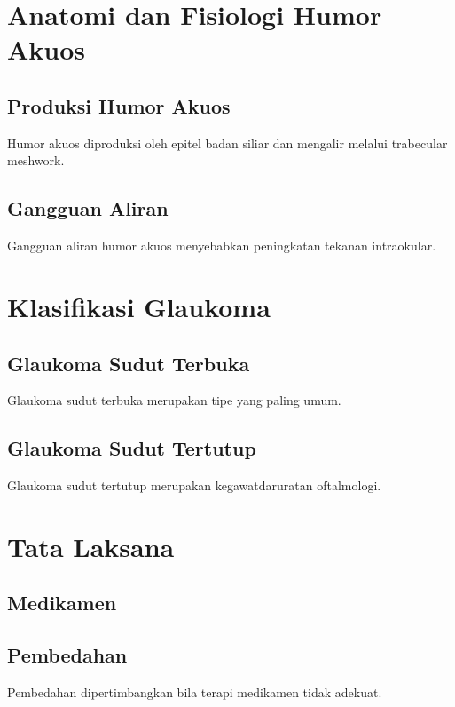 \documentclass[12pt]{report}
\newcommand{\frameworkRoot}{../../}
\begin{document}



\chapter{Anatomi dan Fisiologi Humor Akuos}
\section{Produksi Humor Akuos}
Humor akuos diproduksi oleh epitel badan siliar dan mengalir melalui
trabecular meshwork.\supercite{pratamaTataLaksanaMedikamentosa2019}

\section{Gangguan Aliran}
Gangguan aliran humor akuos menyebabkan peningkatan tekanan intraokular.

\chapter{Klasifikasi Glaukoma}
\section{Glaukoma Sudut Terbuka}
Glaukoma sudut terbuka merupakan tipe yang paling umum.

\section{Glaukoma Sudut Tertutup}
Glaukoma sudut tertutup merupakan kegawatdaruratan oftalmologi.\supercite{perdamiPanduanManajemenGlaukoma2021}

\chapter{Tata Laksana}
\section{Medikamen}

\section{Pembedahan}
Pembedahan dipertimbangkan bila terapi medikamen tidak adekuat.

\printbibliography[title={Daftar Pustaka}]
\end{document}
